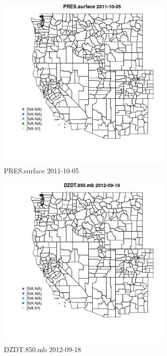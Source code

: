 \begin{figure} 
\centering  
\includegraphics[width=0.77\textwidth]{Code_Outputs/ML_input_report_ML_input_PM25_Step5_part_d_de_duplicated_aves_ML_input_MapObsPRESsurface2011-10-05.jpg} 
\caption{\label{fig:ML_input_report_ML_input_PM25_Step5_part_d_de_duplicated_aves_ML_inputMapObsPRESsurface2011-10-05}PRES.surface 2011-10-05} 
\end{figure} 
 

\begin{figure} 
\centering  
\includegraphics[width=0.77\textwidth]{Code_Outputs/ML_input_report_ML_input_PM25_Step5_part_d_de_duplicated_aves_ML_input_MapObsDZDT850mb2012-09-18.jpg} 
\caption{\label{fig:ML_input_report_ML_input_PM25_Step5_part_d_de_duplicated_aves_ML_inputMapObsDZDT850mb2012-09-18}DZDT.850.mb 2012-09-18} 
\end{figure} 
 

